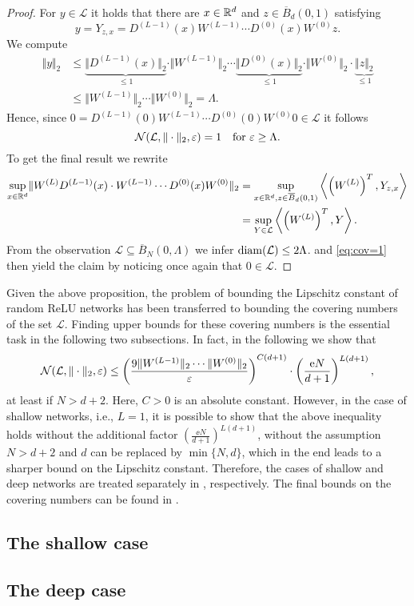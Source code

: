 \begin{proof}
For $y \in \mathcal{L}$ it holds that there are $x \in \mathbb{R}^d$ and $z \in \overline{B}_d(0,1)$ satisfying 
\begin{equation*}
y=Y_{z,x} = D^{(L-1)}(x) W^{(L-1)}\cdots D^{(0)}(x) W^{(0)}z. 
\end{equation*}
We compute
\begin{align*}
\Vert y \Vert_2 &\leq \underbrace{\Vert D^{(L-1)}(x)\Vert_2}_{\leq 1} \cdot \Vert W^{(L-1)}\Vert_2 \cdots \underbrace{\Vert D^{(0)}(x) \Vert_2}_{\leq 1} \cdot \Vert W^{(0)} \Vert_2 \cdot \underbrace{\Vert z \Vert_2}_{\leq 1} \\
&\leq \Vert W^{(L-1)} \Vert_2 \cdots \Vert W^{(0)} \Vert_2 = \Lambda.
\end{align*}
Hence, since $0 = D^{(L-1)}(0) W^{(L-1)}\cdots D^{(0)}(0)W^{(0)}0 \in \mathcal{L}$ it follows 
\begin{equation}\label{eq:cov=1}
\mathcal{N}(\mathcal{L}, \Vert \cdot \Vert_2, \varepsilon) = 1 \quad \text{for } \varepsilon \geq  \Lambda.
\end{equation}
To get the final result we rewrite
\begin{align*}
\underset{x \in \mathbb{R}^d}{\sup} \Vert W^{(L)}D^{(L-1)}(x)\cdot W^{(L-1)}\cdots D^{(0)}(x) W^{(0)} \Vert_2  &=  \underset{x \in \mathbb{R}^d, z \in \overline{B}_d(0,1)}{\sup} \left\langle \left(W^{(L)}\right)^T, Y_{z,x}\right\rangle  \\
&=   \underset{Y \in \mathcal{L}}{\sup} \left\langle \left(W^{(L)}\right)^T, Y \right\rangle.
\end{align*}
From the observation $\mathcal{L} \subseteq \overline{B}_N(0, \Lambda)$ we infer $\operatorname{diam}(\mathcal{L}) \leq 2\Lambda$.  and \eqref{eq:cov=1} then yield the claim by noticing once again that $0 \in \mathcal{L}$.
\end{proof}
Given the above proposition, the problem of bounding the Lipschitz constant of random ReLU networks has been transferred to bounding the covering numbers of the set $\mathcal{L}$. Finding upper bounds for these covering numbers is the essential task in the following two subsections. In fact, in the following we show that
\begin{equation*}
\mathcal{N}(\mathcal{L}, \Vert \cdot \Vert_2, \varepsilon) \leq \left(\frac{9 \Vert W^{(L-1)} \Vert_2 \cdots \Vert W^{(0)} \Vert_2}{\varepsilon} \right)^{C(d+1)} \cdot \left(\frac{\mathrm{e} N}{d+1}\right)^{L(d+1)},
\end{equation*}
at least if $N > d+2$. Here, $C>0$ is an absolute constant. However, in the case of shallow networks, i.e., $L=1$, it is possible to show that the above inequality holds without the additional factor $\left(\frac{\ee N}{d+1}\right)^{L(d+1)}$, without the assumption $N > d+2$ and $d$ can be replaced by $\min\{N,d\}$, which in the end leads to a sharper bound on the Lipschitz constant. Therefore, the cases of shallow and deep networks are treated separately in , respectively. The final bounds on the covering numbers can be found in .


\subsection{The shallow case}

\subsection{The deep case}


